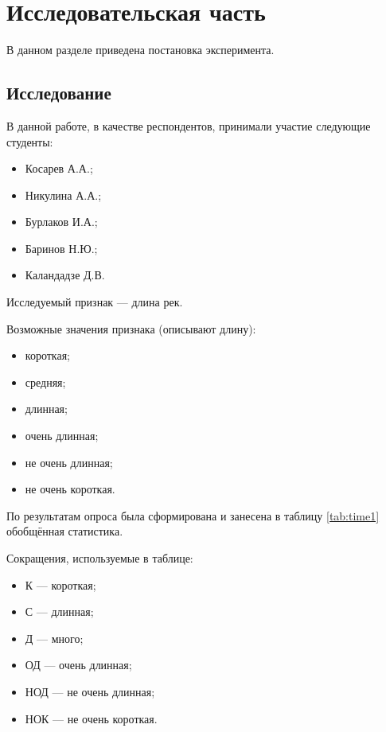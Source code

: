\chapter{Исследовательская часть}

В данном разделе приведена постановка эксперимента.

\section{Исследование}

В данной работе, в качестве респондентов, принимали участие следующие студенты:
\begin{itemize}[label=---]
	\item Косарев А.А.;
	\item Никулина А.А.;
	\item Бурлаков И.А.;
	\item Баринов Н.Ю.;
	\item Каландадзе Д.В.
\end{itemize}

Исследуемый признак --- длина рек.

Возможные значения признака (описывают длину):
\begin{itemize}[label=---]
	\item короткая;
	\item средняя;
	\item длинная;
	\item очень длинная;
	\item не очень длинная; 
	\item не очень короткая.
\end{itemize}

\newpage
По результатам опроса была сформирована и занесена в таблицу \ref{tab:time1} обобщённая статистика.

Сокращения, используемые в таблице:
\begin{itemize}[label=---]
	\item К --- короткая;
	\item С --- длинная;
	\item Д --- много;
	\item ОД --- очень длинная;
	\item НОД --- не очень длинная; 
	\item НОК --- не очень короткая.
\end{itemize}


